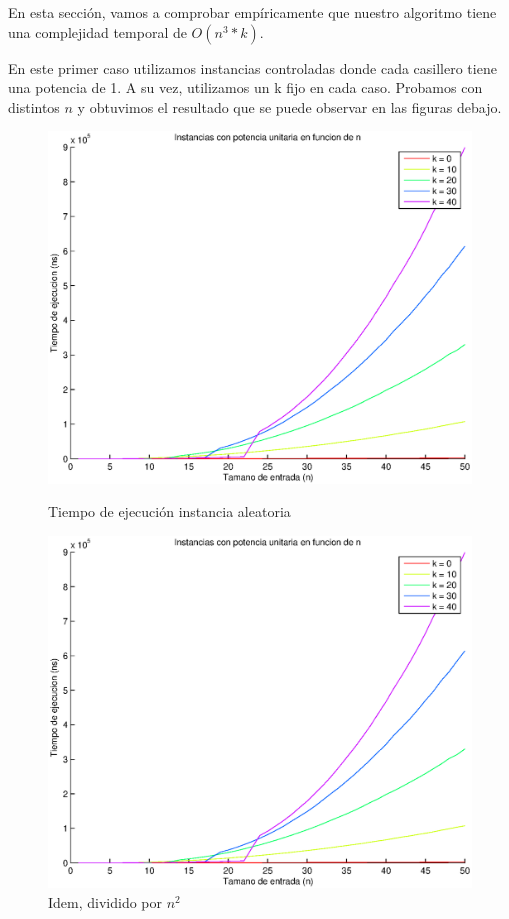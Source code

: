 En esta sección, vamos a comprobar empíricamente que nuestro algoritmo tiene una complejidad temporal de $O(n^3*k)$.

En este primer caso utilizamos instancias controladas donde cada casillero tiene una potencia de 1. A su vez, utilizamos un k fijo en cada caso. Probamos con distintos $n$ y obtuvimos el resultado que se puede observar en las figuras debajo.

\begin{figure}[H]
  \begin{minipage}{0.5\linewidth}
    \includegraphics[width=\linewidth]{img/problema3/instancia_p_1_varios_k.eps}
    \caption{Tiempo de ejecución instancia aleatoria}\label{fig:problema3-k}
  \end{minipage}
  \hfill
  \begin{minipage}{0.5\linewidth}
    \includegraphics[width=\linewidth]{img/problema3/instancia_p_1_varios_k_div_n2.eps}
    \caption{Idem, dividido por $n^2$}\label{fig:problema3-k-n2}
  \end{minipage}
\end{figure}

